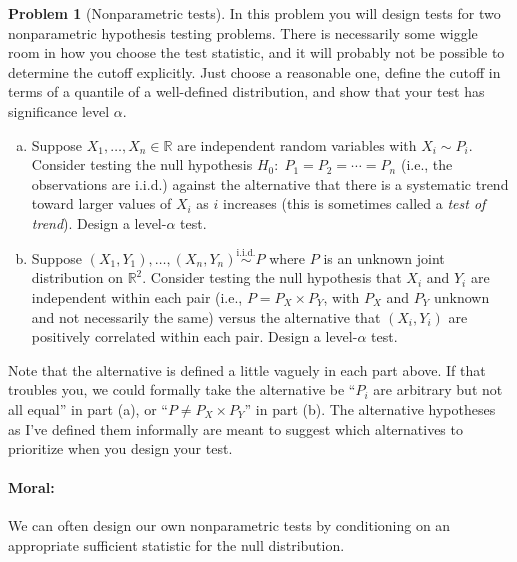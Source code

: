 \documentclass{article}
\newcommand{\RR}{\mathbb{R}}
\newcommand{\simiid}{\overset{\text{i.i.d.}}{\sim}}
\theoremstyle{definition}
\newtheorem{problem}{Problem}
\begin{document}
\begin{problem}[Nonparametric tests]
\label{prob:nonparametric-tests}
In this problem you will design tests for two nonparametric hypothesis testing problems. There is necessarily some wiggle room in how you choose the test statistic, and it will probably not be possible to determine the cutoff explicitly. Just choose a reasonable one, define the cutoff in terms of a quantile of a well-defined distribution, and show that your test has significance level $\alpha$.

\begin{enumerate}[(a)]
\item Suppose $X_1,\ldots,X_n\in \RR$ are independent random variables with $X_i \sim P_i$. Consider testing the null hypothesis $H_0:\; P_1=P_2=\cdots=P_n$ (i.e., the observations are i.i.d.) against the alternative that there is a systematic trend toward larger values of $X_i$ as $i$ increases (this is sometimes called a {\em test of trend}). Design a level-$\alpha$ test.



\item Suppose $(X_1,Y_1),\ldots,(X_n,Y_n) \simiid P$ where $P$ is an unknown joint distribution on $\RR^2$. Consider testing the null hypothesis that $X_i$ and $Y_i$ are independent within each pair (i.e., $P = P_X \times P_Y$, with $P_X$ and $P_Y$ unknown and not necessarily the same) versus the alternative that $(X_i,Y_i)$ are positively correlated within each pair. Design a level-$\alpha$ test.




\end{enumerate}

Note that the alternative is defined a little vaguely in each part above. If that troubles you, we could formally take the alternative be ``$P_i$ are arbitrary but not all equal'' in part (a), or ``$P \neq P_X \times P_Y$'' in part (b). The alternative hypotheses as I've defined them informally are meant to suggest which alternatives to prioritize when you design your test.

\paragraph{Moral:} We can often design our own nonparametric tests by conditioning on an appropriate sufficient statistic for the null distribution.
\end{problem}




\end{document}
